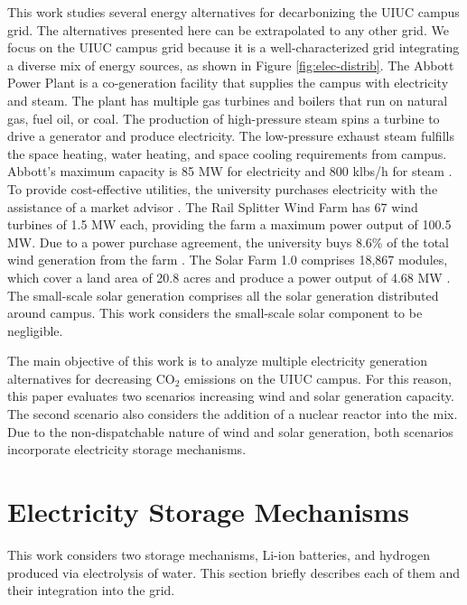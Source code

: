 \documentclass{anstrans}
\begin{document}
This work studies several energy alternatives for decarbonizing the \gls{UIUC} campus grid.
The alternatives presented here can be extrapolated to any other grid.
We focus on the \gls{UIUC} campus grid because it is a well-characterized grid integrating a diverse mix of energy sources, as shown in Figure \ref{fig:elec-distrib}.
The Abbott Power Plant is a co-generation facility that supplies the campus with electricity and steam.
The plant has multiple gas turbines and boilers that run on natural gas, fuel oil, or coal.
The production of high-pressure steam spins a turbine to drive a generator and produce electricity.
The low-pressure exhaust steam fulfills the space heating, water heating, and space cooling requirements from campus.
Abbott’s maximum capacity is 85 MW for electricity and 800 klbs/h for steam \cite{uiucfs_abbott_nodate}.
To provide cost-effective utilities, the university purchases electricity with the assistance of a market advisor \cite{uiucfs_energy_2015}.
The Rail Splitter Wind Farm has 67 wind turbines of 1.5 MW each, providing the farm a maximum power output of 100.5 MW.
Due to a power purchase agreement, the university buys 8.6\% of the total wind generation from the farm \cite{rail_splitter_illinois_2016, uiucfs_energy_2015}.
The Solar Farm 1.0 comprises 18,867 modules, which cover a land area of 20.8 acres and produce a power output of 4.68 MW \cite{uiucfs_solar_2017}.
The small-scale solar generation comprises all the solar generation distributed around campus.
This work considers the small-scale solar component to be negligible.

The main objective of this work is to analyze multiple electricity generation alternatives for decreasing CO$_2$ emissions on the UIUC campus.
For this reason, this paper evaluates two scenarios increasing wind and solar generation capacity.
The second scenario also considers the addition of a nuclear reactor into the mix.
Due to the non-dispatchable nature of wind and solar generation, both scenarios incorporate electricity storage mechanisms.


\section{Electricity Storage Mechanisms}

This work considers two storage mechanisms, Li-ion batteries, and hydrogen produced via electrolysis of water.
This section briefly describes each of them and their integration into the grid.
\end{document}

